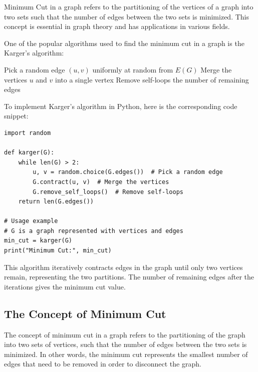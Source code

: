 \documentclass[12pt]{book} %
\begin{document}
Minimum Cut in a graph refers to the partitioning of the vertices of a graph into two sets such that the number of edges between the two sets is minimized. This concept is essential in graph theory and has applications in various fields.

One of the popular algorithms used to find the minimum cut in a graph is the Karger's algorithm:
\FloatBarrier
\begin{algorithm}
\caption{Karger's Algorithm for Minimum Cut}
\begin{algorithmic}[1]
    \State Pick a random edge $(u, v)$ uniformly at random from $E(G)$
    \State Merge the vertices $u$ and $v$ into a single vertex
    \State Remove self-loops
\EndWhile
\State \Return the number of remaining edges
\EndFunction
\end{algorithmic}
\end{algorithm}
\FloatBarrier
To implement Karger's algorithm in Python, here is the corresponding code snippet:
\FloatBarrier
\begin{lstlisting}
import random

def karger(G):
    while len(G) > 2:
        u, v = random.choice(G.edges())  # Pick a random edge
        G.contract(u, v)  # Merge the vertices
        G.remove_self_loops()  # Remove self-loops
    return len(G.edges())

# Usage example
# G is a graph represented with vertices and edges
min_cut = karger(G)
print("Minimum Cut:", min_cut)
\end{lstlisting}
\FloatBarrier
This algorithm iteratively contracts edges in the graph until only two vertices remain, representing the two partitions. The number of remaining edges after the iterations gives the minimum cut value.

\subsection{The Concept of Minimum Cut}

The concept of minimum cut in a graph refers to the partitioning of the graph into two sets of vertices, such that the number of edges between the two sets is minimized. In other words, the minimum cut represents the smallest number of edges that need to be removed in order to disconnect the graph.
\end{document}
